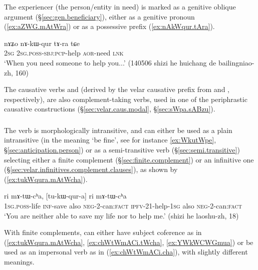 The experiencer (the person/entity in need) is marked as a genitive oblique argument (§\ref{sec:gen.beneficiary}), either as a genitive pronoun (\ref{ex:aZWG.mAtWra}) or as a possessive prefix (\ref{ex:nAkWqur.tAra}).
 
\begin{exe} 
\ex \label{ex:nAkWqur.tAra}
\gll nɤʑo nɤ-kɯ-qur tɤ-ra tɕe \\
\textsc{2sg} \textsc{2sg}.\textsc{poss}-\textsc{sbj}:\textsc{pcp}-help \textsc{aor}-need \textsc{lnk} \\
\glt `When you need someone to help you...' (140506 shizi he huichang de bailingniao-zh, 160)
\end{exe}  


The causative verbs  and   (derived by the velar causative prefix from  and , respectively), are also complement-taking verbs, used in one of the periphrastic causative constructions (§\ref{sec:velar.caus.modal}, §\ref{sec:sWpa.sABzu}).

 \subsubsection{} \label{sec:cha.verb}
The verb  is morphologically intransitive, and can either be used as a plain intransitive (in the meaning `be fine', see for instance \ref{ex:WkutWpe}, §\ref{sec:anticipation.person}) or as a semi-transitive verb (§\ref{sec:semi.transitive}) selecting either a finite complement (§\ref{sec:finite.complement}) or an infinitive one (§\ref{sec:velar.infinitives.complement.clauses}), as shown by (\ref{ex:tukWqura.mAtWcha}).

 \begin{exe}
\ex \label{ex:tukWqura.mAtWcha}
 \gll  [a-sroʁ kɤ-ri] ri mɤ-tɯ-cʰa, [tu-kɯ-qur-a] ri mɤ-tɯ-cʰa  \\
 \textsc{1sg}.\textsc{poss}-life \textsc{inf}-save also \textsc{neg}-2-can:\textsc{fact} \textsc{ipfv}-2\fl{}1-help-\textsc{1sg} also \textsc{neg}-2-can:\textsc{fact}  \\
 \glt `You are neither able to save my life nor to help me.' (shizi he laoshu-zh, 18)
    \end{exe}    

With finite complements,  can either have subject coference as in (\ref{ex:tukWqura.mAtWcha}, \ref{ex:chWtWmACi.tWcha}, \ref{ex:YWkWCWGmua}) or be used as an impersonal verb as in (\ref{ex:chWtWmACi.cha}), with slightly different meanings.
   
